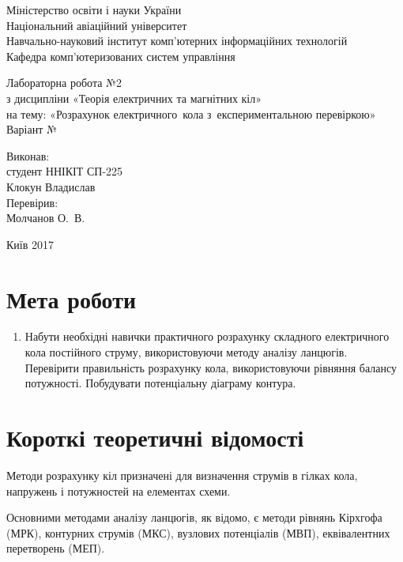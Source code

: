 \documentclass[a4paper,oneside,DIV=10,12pt]{scrartcl}
\begin{document}
	\begin{titlepage}
		\begin{center}
			Міністерство освіти і науки України\\
			Національний авіаційний університет\\
			Навчально-науковий інститут комп'ютерних інформаційних технологій\\
			Кафедра комп'ютеризованих систем управління
			
			\vspace{\fill}
				Лабораторна робота №2\\
				з дисципліни «Теорія електричних та магнітних кіл»\\
				на тему: «Розрахунок електричного~кола з~експериментальною перевіркою»\\
				Варіант №
				
			\vspace{\fill}
			
			\begin{flushright}
				Виконав:\\
				студент ННІКІТ СП-225\\
				Клокун Владислав\\
				Перевірив:\\
				Молчанов О.~В.
			\end{flushright}
			Київ 2017
		\end{center}
	\end{titlepage}
	
	\section{Мета роботи}
		\begin{enumerate}
			\item Набути необхідні навички практичного розрахунку складного електричного кола постійного струму, використовуючи методу аналізу ланцюгів. Перевірити правильність розрахунку кола, використовуючи рівняння балансу потужності. Побудувати потенціальну діаграму контура.
		\end{enumerate}
		
	\section{Короткі теоретичні відомості}
		Методи розрахунку кіл призначені для визначення струмів в гілках кола, напружень і потужностей на елементах схеми.
		
		Основними методами аналізу ланцюгів, як відомо, є методи рівнянь Кірхгофа (МРК), контурних струмів (МКС), вузлових потенціалів (МВП), еквівалентних перетворень (МЕП).
		
\end{document}
